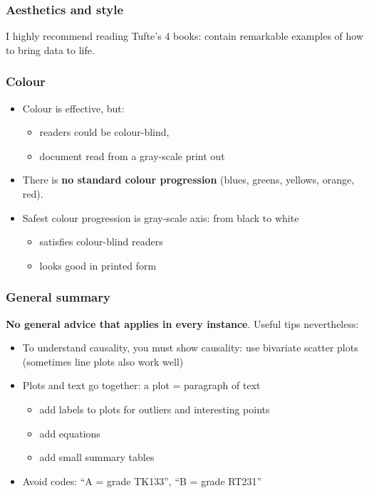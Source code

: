 \begin{frame}\frametitle{Aesthetics and style}
	
	I highly recommend reading Tufte's 4 books: contain remarkable examples of how to bring data to life.
\end{frame}

\begin{frame}\frametitle{Colour}
	\begin{itemize}
		\item	Colour is effective, but: 
		\begin{itemize}
			\item	readers could be colour-blind, 
			\item	document read from a gray-scale print out 
		\end{itemize}
	\end{itemize}
	\begin{itemize}
		\item	There is \textbf{no standard colour progression} (blues, greens, yellows, orange, red). 
		\item	Safest colour progression is gray-scale axis: from black to white 
		\begin{itemize}
			\item	satisfies colour-blind readers 
			\item	looks good in printed form 
		\end{itemize}
	\end{itemize}
\end{frame}

\begin{frame}\frametitle{General summary}
	
	\textbf{No general advice that applies in every instance}. Useful tips nevertheless:
	\begin{itemize}
		\item	To understand causality, you must show causality: use bivariate scatter plots (sometimes line plots also work well) 
		\item	Plots and text go together: a plot = paragraph of text 
		\begin{itemize}
			\item	add labels to plots for outliers and interesting points 
			\item	add equations 
			\item	add small summary tables 
		\end{itemize}
		\item	Avoid codes: ``A = grade TK133'', ``B = grade RT231'' 
	\end{itemize}
\end{frame}

